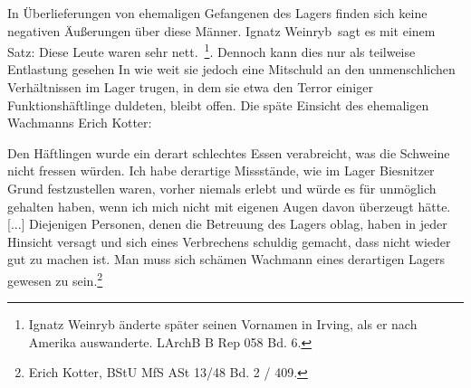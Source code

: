 \documentclass[a4paper,12pt,ngerman,
]{nisebook}
\begin{document}
In Überlieferungen von ehemaligen Gefangenen des Lagers finden sich keine negativen Äußerungen über diese Männer. Ignatz Weinryb~sagt es mit einem Satz: \glqq Diese Leute waren sehr nett.\grqq~\footnote{Ignatz Weinryb änderte später seinen Vornamen in Irving, als er nach Amerika auswanderte. LArchB B Rep 058 Bd. 6.}. Dennoch kann dies nur als teilweise Entlastung gesehen
In wie weit sie jedoch eine Mitschuld an den unmenschlichen Verhältnissen im Lager trugen, in dem sie etwa den Terror einiger Funktionshäftlinge duldeten, bleibt offen.
\newpage
Die späte Einsicht des ehemaligen Wachmanns Erich Kotter:
\label{kotter}
\begin{leftbar}
Den Häftlingen wurde ein derart schlechtes Essen verabreicht, was die Schweine nicht fressen würden. Ich habe derartige Missstände, wie im Lager Biesnitzer Grund festzustellen waren, vorher niemals erlebt und würde es für unmöglich gehalten haben, wenn ich mich nicht mit eigenen Augen davon überzeugt hätte. [...] Diejenigen Personen, denen die Betreuung des Lagers oblag, haben in jeder Hinsicht versagt und sich eines Verbrechens schuldig gemacht, dass nicht wieder gut zu machen ist. Man muss sich schämen Wachmann eines derartigen Lagers gewesen zu sein.\footnote{Erich Kotter, BStU MfS ASt 13/48 Bd. 2 / 409.}
\end{leftbar}
\end{document}
